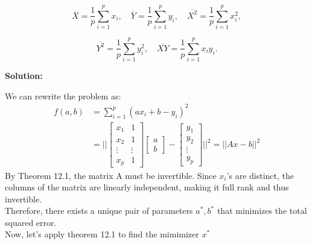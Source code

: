 \documentclass{article}
\begin{document}
\begin{enumerate}
\begin{bb}
\[
\overline{X} = \frac{1}{p} \sum_{i=1}^p x_i, \quad
\overline{Y} = \frac{1}{p} \sum_{i=1}^p y_i, \quad
\overline{X^2} = \frac{1}{p} \sum_{i=1}^p x_i^2,
\]

\[
\overline{Y^2} = \frac{1}{p} \sum_{i=1}^p y_i^2, \quad
\overline{XY} = \frac{1}{p} \sum_{i=1}^p x_i y_i.
\]
\end{bb}

\textbf{Solution: } 

We can rewrite the problem as:
\begin{align*}
    f(a,b) &= \sum_{i=1}^{p}(ax_i + b - y_i)^2 \\
    &= ||\begin{bmatrix}
        x_1 & 1 \\
        x_2 & 1 \\
        \vdots & \vdots \\
        x_p & 1
        \end{bmatrix}
        \begin{bmatrix}
            a \\ b
        \end{bmatrix} - \begin{bmatrix}
            y_1 \\ y_2 \\ \vdots \\ y_p
        \end{bmatrix}||^2 = ||Ax-b||^2
\end{align*}
By Theorem 12.1, the matrix A must be invertible. Since $x_i$'s are distinct, the columns of the matrix are linearly independent, making it full rank and thus invertible. 
    \\Therefore, there exists a unique pair of parameters $a^*, b^*$ that minimizes the total squared error.
    \\Now, let's apply theorem 12.1 to find the mimimizer $x^*$


\end{enumerate}
\end{document}
